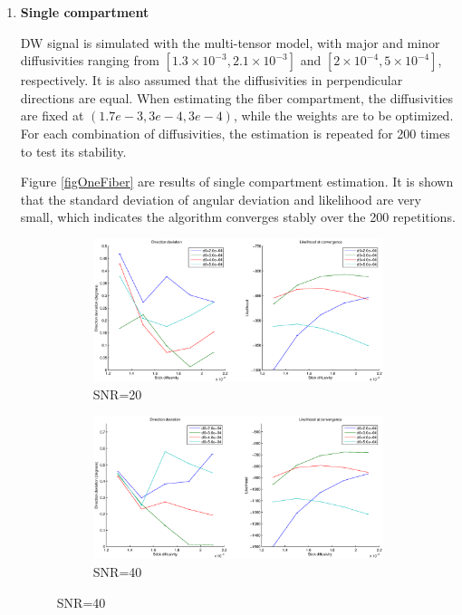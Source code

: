 \documentclass{article}
\begin{document}
\begin{enumerate}

\item{\textbf{Single compartment}}

DW signal is simulated with the multi-tensor model, with major and minor diffusivities ranging from $[1.3\times 10^{-3}, 2.1\times 10^{-3}]$ and $[2\times 10^{-4}, 5\times 10^{-4}]$, respectively. It is also assumed that the diffusivities in perpendicular directions are equal. When estimating the fiber compartment, the diffusivities are fixed at $(1.7e-3, 3e-4, 3e-4)$, while the weights are to be optimized. For each combination of diffusivities, the estimation is repeated for 200 times to test its stability.

Figure \ref{figOneFiber} are results of single compartment estimation. It is shown that the standard deviation of angular deviation and likelihood are very small, which indicates the algorithm converges stably over the 200 repetitions.

\begin{figure}[H]
  \caption{\label{figOneFiber}Single compartment estimation results}
  \begin{subfigure}{\textwidth}
    \centering
    \includegraphics[width=\textwidth]{figures/one_fiber__snr=20.eps}
    \caption{SNR=20}
  \end{subfigure}
  \begin{subfigure}{\textwidth}
    \centering
    \includegraphics[width=\textwidth]{figures/one_fiber__snr=40.eps}
    \caption{SNR=40}
  \end{subfigure}
\end{figure}


\end{enumerate}
\end{document}
